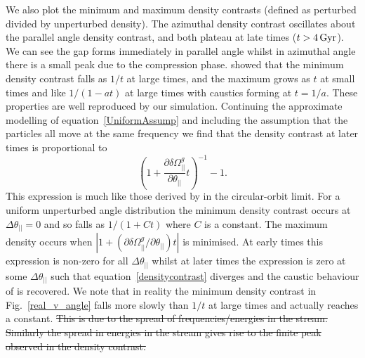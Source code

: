 \documentclass[useAMS,usenatbib,fleqn,a4paper]{mn2e}
\def\Gyr{\,{\rm Gyr}}
\providecommand{\DIFdeltex}[1]{{\protect\color{red}\sout{#1}}}                      %
\providecommand{\DIFdelbegin}{} %
\providecommand{\DIFdelend}{} %
\providecommand{\DIFdel}[1]{\texorpdfstring{\DIFdeltex{#1}}{}} %
\begin{document}
We also plot the minimum and maximum density contrasts (defined as perturbed divided by unperturbed density). The azimuthal density contrast oscillates about the parallel angle density contrast, and both plateau at late times ($t>4\Gyr$). We can see the gap forms immediately in parallel angle whilst in azimuthal angle there is a small peak due to the compression phase. \cite{ErkalBelokurov2015} showed that the minimum density contrast falls as $1/t$ at large times, and the maximum grows as $t$ at small times and like $1/(1-at)$ at large times with caustics forming at $t=1/a$. These properties are well reproduced by our simulation. Continuing the approximate modelling of equation~\eqref{UniformAssump} and including the assumption that the particles all move at the same frequency we find that the density contrast at later times is proportional to
\begin{equation}
(1+\frac{\partial\delta\Omega^g_{||}}{\partial\theta_{||}}t)^{-1}-1.
\label{densitycontrast}
\end{equation}
This expression is much like those derived by \cite{ErkalBelokurov2015} in the circular-orbit limit. For a uniform unperturbed angle distribution the minimum density contrast occurs at $\Delta\theta_{||}=0$ and so falls as $1/(1+Ct)$ where $C$ is a constant. The maximum density occurs when $|1+(\partial\delta\Omega^g_{||}/\partial\theta_{||})t|$ is minimised. At early times this expression is non-zero for all $\Delta\theta_{||}$ whilst at later times the expression is zero at some $\Delta\theta_{||}$ such that equation~\eqref{densitycontrast} diverges and the caustic behaviour of \cite{ErkalBelokurov2015} is recovered. We note that in reality the minimum density contrast in Fig.~\ref{real_v_angle} falls more slowly than $1/t$ at large times and actually reaches a constant.
\DIFdelbegin \DIFdel{This is due to the spread of frequencies/energies in the stream. Similarly the spread in energies in the stream gives rise to the finite peak observed in the density contrast.
}\DIFdelend 
\end{document}
